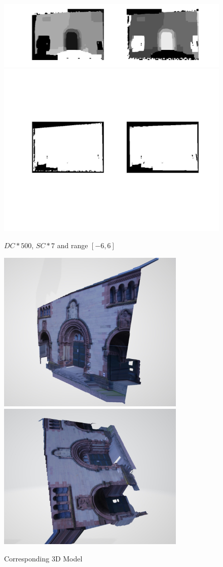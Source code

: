 \documentclass[12pt]{article}
\begin{document}
\begin{figure}[H]
	\centering
	\includegraphics[width=1.1\textwidth]{3.jpg}
	\includegraphics[width=1.1\textwidth]{4.jpg}
	\caption{$DC*500$, $SC*7$ and range $[-6, 6]$}
	\label{fig1}
\end{figure}
\begin{figure}[H]
	\centering
	\includegraphics[width=0.8\textwidth]{7.jpg}
	\includegraphics[width=0.8\textwidth]{8.jpg}
	\caption{Corresponding 3D Model}
	\label{fig1}
\end{figure}
\end{document}
